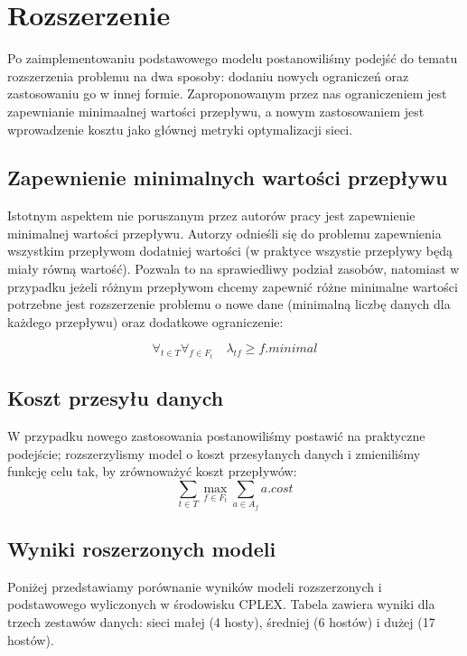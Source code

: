 \section{Rozszerzenie}

Po zaimplementowaniu podstawowego modelu postanowiliśmy podejść do tematu
rozszerzenia problemu na dwa sposoby: dodaniu nowych ograniczeń
oraz zastosowaniu go w innej formie. Zaproponowanym przez nas ograniczeniem jest
zapewnianie minimaalnej wartości przepływu, a nowym zastosowaniem jest wprowadzenie
kosztu jako głównej metryki optymalizacji sieci.

\subsection{Zapewnienie minimalnych wartości przepływu}

Istotnym aspektem nie poruszanym przez autorów pracy jest zapewnienie
minimalnej wartości przepływu. Autorzy odnieśli się do problemu zapewnienia wszystkim
przepływom dodatniej wartości (w praktyce wszystie przepływy będą miały równą wartość).
Pozwala to na sprawiedliwy podział zasobów, natomiast w przypadku jeżeli różnym
przepływom chcemy zapewnić różne minimalne wartości potrzebne jest rozszerzenie problemu
o nowe dane (minimalną liczbę danych dla każdego przepływu) oraz dodatkowe ograniczenie:

\begin{equation}
  \forall_{t \in T} \forall_{f \in F_t} \quad \lambda_{tf} \ge f.minimal
\end{equation}

\subsection{Koszt przesyłu danych}

W przypadku nowego zastosowania postanowiliśmy postawić na praktyczne podejście;
rozszerzylismy model o koszt przesyłanych danych i zmieniliśmy funkcję celu tak,
by zrównoważyć koszt przepływów:
\begin{equation}
  \sum_{t \in T} \max_{f \in F_t} \sum_{a \in A_f} a.cost
\end{equation}

\subsection{Wyniki roszerzonych modeli}
Poniżej przedstawiamy porównanie wyników modeli rozszerzonych i podstawowego wyliczonych
w środowisku CPLEX. Tabela zawiera wyniki dla trzech zestawów danych: sieci małej (4 hosty),
średniej (6 hostów) i dużej (17 hostów).
